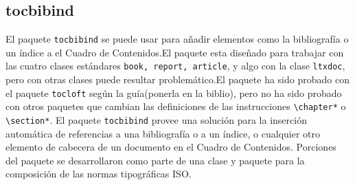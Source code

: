         \subsection{tocbibind}\label{ssec:tocbibind}
	El paquete \verb+tocbibind+ se puede usar para añadir elementos como la bibliografía o un índice a el Cuadro de Contenidos.El paquete esta diseñado para trabajar con las cuatro clases estándares \verb+book, report, article+, y algo con la clase \verb+ltxdoc+, pero con otras clases puede resultar problemático.El paquete ha sido probado con el paquete \verb+tocloft+ según la guía(ponerla en la biblio), pero no ha sido probado con otros paquetes que cambian las definiciones de las instrucciones \verb+\chapter*+ o \verb+\section*+.
	El paquete \verb+tocbibind+ provee una solución para la inserción automática de referencias a una bibliografía o a un índice, o cualquier otro elemento de cabecera de un documento en el Cuadro de Contenidos. Porciones del paquete se desarrollaron como parte de una clase y paquete  para la composición de las normas tipográficas ISO.
